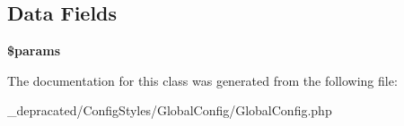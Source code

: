 \subsection*{\-Data \-Fields}
\begin{DoxyCompactItemize}
\item 
\hypertarget{class_config_styles_1_1_global_config_1_1_global_config_afe68e6fbe7acfbffc0af0c84a1996466}{
{\bfseries \$params}}
\label{class_config_styles_1_1_global_config_1_1_global_config_afe68e6fbe7acfbffc0af0c84a1996466}

\end{DoxyCompactItemize}


\-The documentation for this class was generated from the following file\-:\begin{DoxyCompactItemize}
\item 
\-\_\-depracated/\-Config\-Styles/\-Global\-Config/\-Global\-Config.\-php\end{DoxyCompactItemize}
